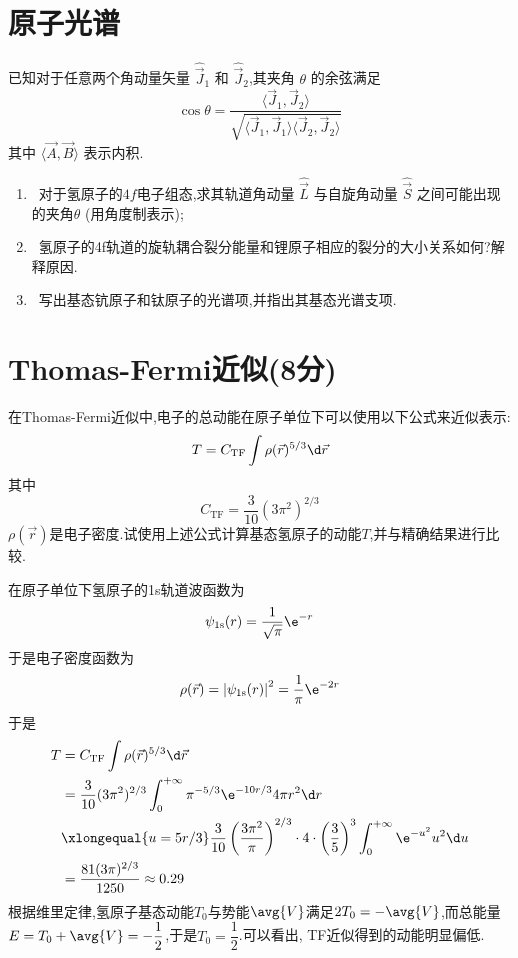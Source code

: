 \documentclass{ctexart}
\begin{document}
\section{原子光谱}
已知对于任意两个角动量矢量 $\hat{\vec{J}}_1$ 和 $\hat{\vec{J}}_2$,其夹角 $\theta$ 的余弦满足
\[\cos\theta=\frac{\langle \vec{J}_1, \vec{J}_2 \rangle}{\sqrt{\langle \vec{J}_1, \vec{J}_1 \rangle \langle \vec{J}_2, \vec{J}_2\rangle}}\]
其中 $\langle \vec{A}, \vec{B} \rangle$ 表示内积.
\begin{enumerate}[label=\tbf{\arabic*.}]
    \item {}\ 对于氢原子的$4f$电子组态,求其轨道角动量 $\hat{\vec{L}}$ 与自旋角动量 $\hat{\vec{S}}$ 之间可能出现的夹角$\theta$ (用角度制表示);
    \item {}\ 氢原子的4f轨道的旋轨耦合裂分能量和锂原子相应的裂分的大小关系如何?解释原因.
    \item {}\ 写出基态钪原子和钛原子的光谱项,并指出其基态光谱支项.
\end{enumerate}
\section{Thomas-Fermi近似(8分)}
在Thomas-Fermi近似中,电子的总动能在原子单位下可以使用以下公式来近似表示:
\[T = C_{\text{TF}} \int \rho(\vec{r})^{5/3} 
\d\vec{r}\]其中
\[
C_{\text{TF}} = \frac{3}{10}(3\pi^2)^{2/3}
\]
$\rho(\vec{r})$是电子密度.试使用上述公式计算基态氢原子的动能$T$,并与精确结果进行比较.
\begin{solution}
    在原子单位下氢原子的1s轨道波函数为
    \[\psi_{1\text{s}}(r)=\dfrac{1}{\sqrt{\pi}}\e^{-r}\]
    于是电子密度函数为
    \[\rho(\vec{r})=\left|\psi_{1\text{s}}(r)\right|^2=\dfrac{1}{\pi}\e^{-2r}\]
    于是
    \[\begin{aligned}
        T
        &=C_{\text{TF}} \int \rho(\vec{r})^{5/3}\d\vec{r}\\
        &=\frac{3}{10}(3\pi^2)^{2/3}\int_0^{+\infty}\pi^{-5/3}\e^{-10r/3}4\pi r^2\d r\\
        &\xlongequal{u=5r/3}\dfrac{3}{10}\left(\dfrac{3\pi^2}{\pi}\right)^{2/3}\cdot4\cdot\left(\dfrac35\right)^3\int_{0}^{+\infty}\e^{-u^2}u^2\d u\\
        &=\frac{81(3\pi)^{2/3}}{1250}\approx0.29
    \end{aligned}\]
    根据维里定律,氢原子基态动能$T_0$与势能$\avg{V}$满足$2T_0=-\avg{V}$,而总能量$E=T_0+\avg{V}=-\dfrac12$,于是$T_0=\dfrac12$.可以看出, TF近似得到的动能明显偏低.
\end{solution}
\end{document}
